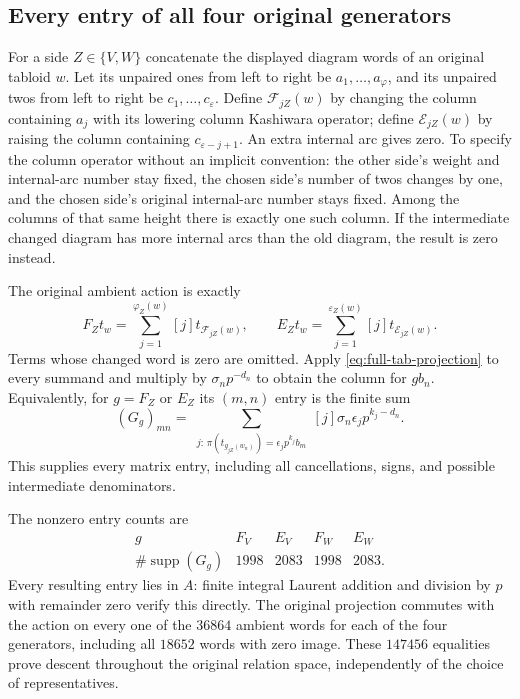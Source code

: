 \subsection{Every entry of all four original generators}

For a side $Z\in\{V,W\}$ concatenate the displayed diagram
words of an original tabloid $w$. Let its unpaired ones from
left to right be $a_1,\ldots,a_\varphi$, and its unpaired twos
from left to right be $c_1,\ldots,c_\varepsilon$. Define
$\mathcal F_{jZ}(w)$ by changing the column containing $a_j$
with its lowering column Kashiwara operator; define
$\mathcal E_{jZ}(w)$ by raising the column containing
$c_{\varepsilon-j+1}$. An extra internal arc gives zero.
To specify the column operator without an implicit convention:
the other side's weight and internal-arc number stay fixed,
the chosen side's number of twos changes by one, and the chosen
side's original internal-arc number stays fixed. Among the
columns of that same height there is exactly one such column.
If the intermediate changed diagram has more internal arcs
than the old diagram, the result is zero instead.

The original ambient action is exactly
\begin{equation}\label{eq:full-original-action}
 F_Zt_w=\sum_{j=1}^{\varphi_Z(w)}[j]t_{\mathcal F_{jZ}(w)},
 \qquad
 E_Zt_w=\sum_{j=1}^{\varepsilon_Z(w)}[j]t_{\mathcal E_{jZ}(w)}.
\end{equation}
Terms whose changed word is zero are omitted. Apply
\eqref{eq:full-tab-projection} to every summand and multiply by
$\sigma_np^{-d_n}$ to obtain the column for $g b_n$.
Equivalently, for $g=F_Z$ or $E_Z$ its $(m,n)$ entry is the
finite sum
\begin{equation}\label{eq:full-all-matrix-entries}
 (G_g)_{mn}=
 \sum_{\substack{j:\,\pi(t_{g_{jZ}(w_n)})
       =\epsilon_jp^{k_j}b_m}}
       [j]\sigma_n\epsilon_jp^{k_j-d_n}.
\end{equation}
This supplies every matrix entry, including all cancellations,
signs, and possible intermediate denominators.

The nonzero entry counts are
\[
\begin{array}{c|rrrr}
g&F_V&E_V&F_W&E_W\\\hline
\#\operatorname{supp}(G_g)&1998&2083&1998&2083.
\end{array}
\]
Every resulting entry
lies in $A$: finite integral Laurent addition and division by
$p$ with remainder zero verify this directly. The original
projection commutes with the action on every one of the $36864$
ambient words for each of the four generators, including all
$18652$ words with zero image. These $147456$ equalities prove
descent throughout the original relation space, independently
of the choice of representatives.


